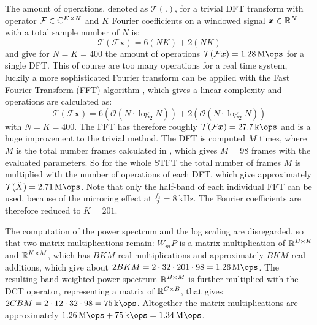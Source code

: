 The amount of operations, denoted as $\mathcal{T(.)}$, for a trivial DFT transform with operator $\mathcal{F} \in \mathbb{C}^{K \times N}$ and $K$ Fourier coefficients on a windowed signal $\bm{x} \in \mathbb{R}^N$ with a total sample number of $N$ is:
\begin{equation}
  \mathcal{T}(\mathcal{F} \bm{x}) = 6 (N K) + 2 (N K)
\end{equation}
and give for $N = K = 400$ the amount of operations $\mathcal{T}(\mathcal{F} \bm{x}) = \SI{1.28}{\mega\ops}$ for a single DFT.
This of course are too many operations for a real time system, luckily a more sophisticated Fourier transform can be applied with the Fast Fourier Transform (FFT) algorithm \cite{Brigham1967}, which gives a linear complexity and operations are calculated as:
\begin{equation}
  \mathcal{T}(\mathcal{F} \bm{x}) = 6 (\mathcal{O}(N \cdot \log_2 N)) + 2 (\mathcal{O}(N \cdot \log_2 N))
\end{equation}
with $N = K = 400$.
The FFT has therefore roughly $\mathcal{T}(\mathcal{F} \bm{x}) = \SI{27.7}{\kilo\ops}$ and is a huge improvement to the trivial method.
The DFT is computed $M$ times, where $M$ is the total number frames calculated in , which gives $M = 98$ frames with the evaluated parameters.
So for the whole STFT the total number of frames $M$ is multiplied with the number of operations of each DFT, which give approximately $\mathcal{T}(\tilde{X}) = \SI{2.71}{\mega\ops}$.
Note that only the half-band of each individual FFT can be used, because of the mirroring effect at $\frac{f_s}{2} = \SI{8}{\kilo\hertz}$.
The Fourier coefficients are therefore reduced to $K = 201$.

The computation of the power spectrum and the log scaling are disregarded, so that two matrix multiplications remain:
$W_m P$ is a matrix multiplication of $\mathbb{R}^{B \times K}$ and $\mathbb{R}^{K \times M}$, which has $B K M$ real multiplications and approximately $B K M$ real additions, which give about $2 B K M = 2 \cdot 32 \cdot 201 \cdot 98 =  \SI{1.26}{\mega\ops}$.
The resulting band weighted power spectrum $\mathbb{R}^{B \times M}$ is further multiplied with the DCT operator, representing a matrix of $\mathbb{R}^{C \times B}$, that gives $2 C B M = 2 \cdot 12 \cdot 32 \cdot 98 = \SI{75}{\kilo\ops}$.
Altogether the matrix multiplications are approximately $\SI{1.26}{\mega\ops} + \SI{75}{\kilo\ops} = \SI{1.34}{\mega\ops}$.

